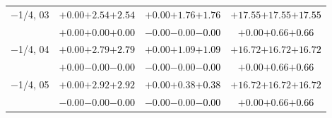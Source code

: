 \documentclass[compress]{beamer}
\begin{document}
\begin{frame}
\begin{tabular}{r | c | c | c}
$-$1/4, 03 & $+0.00$\hspace{0.1 cm}$+2.54$\hspace{0.1 cm}\textcolor{black}{$+2.54$} & $+0.00$\hspace{0.1 cm}$+1.76$\hspace{0.1 cm}\textcolor{black}{$+1.76$} & $+17.55$\hspace{0.1 cm}$+17.55$\hspace{0.1 cm}\textcolor{black}{$+17.55$} \\
           & $+0.00$\hspace{0.1 cm}$+0.00$\hspace{0.1 cm}\textcolor{black}{$+0.00$} & $-0.00$\hspace{0.1 cm}$-0.00$\hspace{0.1 cm}\textcolor{black}{$-0.00$} & $+0.00$\hspace{0.1 cm}$+0.66$\hspace{0.1 cm}\textcolor{black}{$+0.66$} \\
$-$1/4, 04 & $+0.00$\hspace{0.1 cm}$+2.79$\hspace{0.1 cm}\textcolor{black}{$+2.79$} & $+0.00$\hspace{0.1 cm}$+1.09$\hspace{0.1 cm}\textcolor{black}{$+1.09$} & $+16.72$\hspace{0.1 cm}$+16.72$\hspace{0.1 cm}\textcolor{black}{$+16.72$} \\
           & $+0.00$\hspace{0.1 cm}$-0.00$\hspace{0.1 cm}\textcolor{black}{$-0.00$} & $-0.00$\hspace{0.1 cm}$-0.00$\hspace{0.1 cm}\textcolor{black}{$-0.00$} & $+0.00$\hspace{0.1 cm}$+0.66$\hspace{0.1 cm}\textcolor{black}{$+0.66$} \\
$-$1/4, 05 & $+0.00$\hspace{0.1 cm}$+2.92$\hspace{0.1 cm}\textcolor{black}{$+2.92$} & $+0.00$\hspace{0.1 cm}$+0.38$\hspace{0.1 cm}\textcolor{black}{$+0.38$} & $+16.72$\hspace{0.1 cm}$+16.72$\hspace{0.1 cm}\textcolor{black}{$+16.72$} \\
           & $-0.00$\hspace{0.1 cm}$-0.00$\hspace{0.1 cm}\textcolor{black}{$-0.00$} & $-0.00$\hspace{0.1 cm}$-0.00$\hspace{0.1 cm}\textcolor{black}{$-0.00$} & $+0.00$\hspace{0.1 cm}$+0.66$\hspace{0.1 cm}\textcolor{black}{$+0.66$} \\

\end{tabular}
\end{frame}
\end{document}
